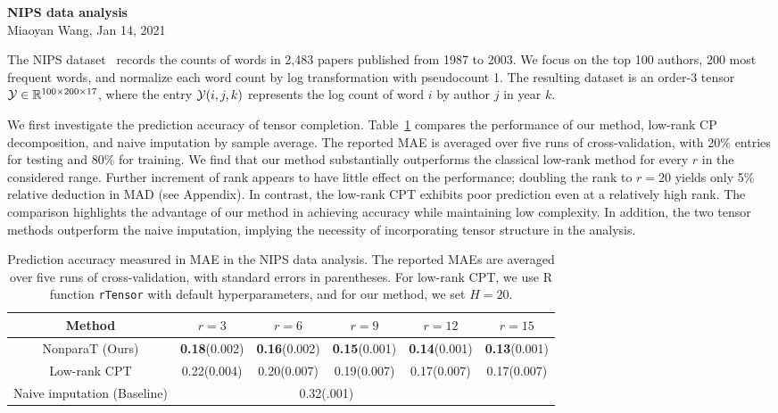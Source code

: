 \documentclass[11pt]{article}
\theoremstyle{plain}
\theoremstyle{definition}
\begin{document}
\begin{center}
{\Large \bf NIPS data analysis} \\
Miaoyan Wang, Jan 14, 2021
\end{center}

The NIPS dataset~\cite{globerson2007euclidean} records the counts of words in 2,483 papers published from 1987 to 2003. We focus on the top 100 authors, 200 most frequent words, and normalize each word count by log transformation with pseudocount 1. The resulting dataset is an order-3 tensor $\mathcal{Y}\in\mathbb{R}^{100\times 200\times 17}$, where the entry $\mathcal{Y}(i,j,k)$ represents the log count of word $i$ by author $j$ in year $k$. 


We first investigate the prediction accuracy of tensor completion. Table~\ref{tab:NIPS} compares the performance of our method, low-rank CP decomposition, and naive imputation by sample average. The reported MAE is averaged over five runs of cross-validation, with 20\% entries for testing and 80\% for training. We find that our method substantially outperforms the classical low-rank method for every $r$ in the considered range. Further increment of rank appears to have little effect on the performance; doubling the rank to $r=20$ yields only 5\% relative deduction in MAD (see Appendix). In contrast, the low-rank CPT exhibits poor prediction even at a relatively high rank. The comparison highlights the advantage of our method in achieving accuracy while maintaining low complexity. In addition, the two tensor methods outperform the naive imputation, implying the necessity of incorporating tensor structure in the analysis. 

\begin{table}[H]
\centering
\begin{tabular}{c|ccccc}
Method & $r = 3$ & $r = 6$ & $r=9$ & $r=12$&$r=15$ \\
\hline
NonparaT (Ours) & {\bf 0.18}(0.002) & {\bf 0.16}(0.002) & {\bf 0.15}(0.001)& {\bf 0.14}(0.001)&{\bf 0.13}(0.001)\\
 \hline
Low-rank CPT &0.22(0.004) & 0.20(0.007) & 0.19(0.007)&0.17(0.007)&0.17(0.007)\\
  \hline
Naive imputation (Baseline)& \multicolumn{4}{c}{0.32(.001)}\\
\end{tabular}
\caption{Prediction accuracy measured in MAE in the NIPS data analysis. The reported MAEs are averaged over five runs of cross-validation, with standard errors in parentheses. For low-rank CPT, we use R function {\tt rTensor} with default hyperparameters, and for our method, we set $H=20$.}\label{tab:NIPS}
\end{table}
\end{document}
